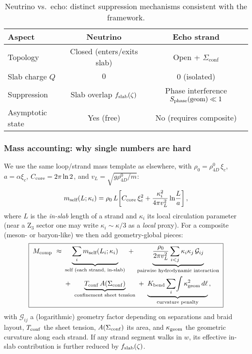 \begin{table}[h!]
\centering
\begin{tabular}{|l|c|c|}
\hline
Aspect & Neutrino & Echo strand \\
\hline
Topology & Closed (enters/exits slab) & Open + $\Sigma_{\mathrm{conf}}$ \\
Slab charge $Q$ & $0$ & $0$ (isolated) \\
Suppression & Slab overlap $f_{\rm slab}(\zeta)$ & Phase interference $S_{\rm phase}(\mathrm{geom})\ll 1$ \\
Asymptotic state & Yes (free) & No (requires composite) \\
\hline
\end{tabular}
\caption{Neutrino vs.\ echo: distinct suppression mechanisms consistent with the framework.}
\label{tab:echo-neutrino-revised}
\end{table}

\subsubsection{Mass accounting: why single numbers are hard}
\label{sec:echo:mass-functional}

We use the same loop/strand mass template as elsewhere, with \(\rho_0=\rho_{4D}^0\,\xi_c\), \(a=\alpha\xi_c\), \(C_{\rm core}=2\pi\ln2\), and \(v_L=\sqrt{g\rho_{4D}^0/m}\):
\[
m_{\text{self}}(L;\kappa_i)=\rho_0\,L\!\left[C_{\rm core}\,\xi_c^2+\frac{\kappa_i^{2}}{4\pi v_L^2}\ln\!\frac{L}{a}\right],
\]
where \(L\) is the \emph{in-slab} length of a strand and \(\kappa_i\) its local circulation parameter (near a Z$_3$ sector one may write $\kappa_i\!\sim\!\kappa/3$ as a \emph{local} proxy). For a composite (meson- or baryon-like) we then add geometry-global pieces:
\begin{equation}
\label{eq:echo-mass-functional}
\boxed{\;
\begin{aligned}
M_{\rm comp}\ \approx\ &
\underbrace{\sum_{i} m_{\text{self}}(L_i;\kappa_i)}_{\text{self (each strand, in-slab)}}\
+\ \underbrace{\frac{\rho_0}{2\pi v_L^{2}}\sum_{i<j}\kappa_i\kappa_j\,\mathcal{G}_{ij}}_{\text{pairwise hydrodynamic interaction}}\\
&+\ \underbrace{T_{\rm conf}\,A(\Sigma_{\rm conf})}_{\text{confinement sheet tension}}\
+\ \underbrace{K_{\rm bend}\sum_i\!\int \kappa_{\rm geom}^2\,d\ell}_{\text{curvature penalty}}\,,
\end{aligned}
\;}
\end{equation}
with $\mathcal{G}_{ij}$ a (logarithmic) geometry factor depending on separations and braid layout, $T_{\rm conf}$ the sheet tension, $A(\Sigma_{\rm conf})$ its area, and $\kappa_{\rm geom}$ the geometric curvature along each strand. If any strand segment walks in $w$, its effective in-slab contribution is further reduced by $f_{\rm slab}(\zeta)$.

